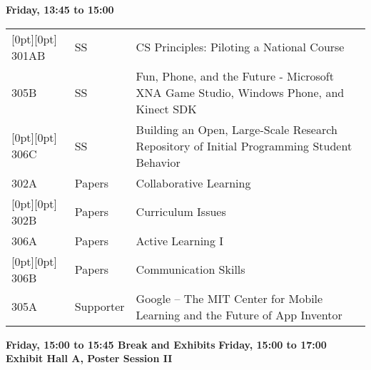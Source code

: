 \noindent
{\sffamily\bfseries Friday, 13:45 to 15:00}\newline\noindent
\begin{tabular*}{5in}{@{}p{0.5in}@{}p{0.75in}@{}p{3.75in}}

\rowcolor[gray]{0.9}[0pt][0pt] 301AB & SS & CS Principles:  Piloting a National Course \\

305B & SS & Fun, Phone, and the Future - Microsoft XNA Game Studio, Windows Phone, and Kinect SDK \\

\rowcolor[gray]{0.9}[0pt][0pt] 306C & SS & Building an Open, Large-Scale Research Repository of Initial Programming Student Behavior \\

302A & Papers & Collaborative Learning \\

\rowcolor[gray]{0.9}[0pt][0pt] 302B & Papers & Curriculum Issues \\

306A & Papers & Active Learning I \\

\rowcolor[gray]{0.9}[0pt][0pt] 306B & Papers & Communication Skills \\

305A & Supporter & Google -- The MIT Center for Mobile Learning and the Future of App Inventor 
\end{tabular*}
{\sffamily\bfseries Friday, 15:00 to 15:45 Break and Exhibits}\newline\noindent
{\sffamily\bfseries Friday, 15:00 to 17:00 Exhibit Hall A, Poster Session II}\newline\noindent



